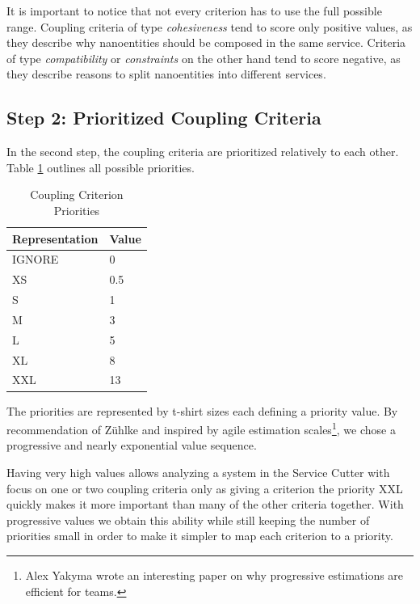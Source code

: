 It is important to notice that not every criterion has to use the full possible range. Coupling criteria of type \textit{cohesiveness} tend to score only positive values, as they describe why nanoentities should be composed in the same service. Criteria of type \textit{compatibility} or \textit{constraints} on the other hand tend to score negative, as they describe reasons to split nanoentities into different services.

\subsection{Step 2: Prioritized Coupling Criteria}

In the second step, the coupling criteria are prioritized relatively to each other. Table \ref{tab:priorities} outlines all possible priorities.

\begin{table}[H]
	\centering
	\caption{Coupling Criterion Priorities}
	\label{tab:priorities}
	\begin{tabular}{|p{70pt}|p{30pt}|}
		\hline	
		Representation & Value  \\
		\hline
		IGNORE & 0  \\
		\hline
		XS & 0.5  \\
		\hline
		S & 1  \\
		\hline
		M & 3  \\
		\hline
		L & 5  \\
		\hline
		XL & 8  \\
		\hline
		XXL & 13  \\
		\hline
	\end{tabular}
\end{table}

The priorities are represented by t-shirt sizes each defining a priority value. By recommendation of Zühlke and inspired by agile estimation scales\footnote{Alex Yakyma wrote an interesting paper on why progressive estimations are efficient for teams\cite{estimation}.}, we chose a progressive and nearly exponential value sequence. 

Having very high values allows analyzing a system in the Service Cutter with focus on one or two coupling criteria only as giving a criterion the priority XXL quickly makes it more important than many of the other criteria together. With progressive values we obtain this ability while still keeping the number of priorities small in order to make it simpler to map each criterion to a priority. 

